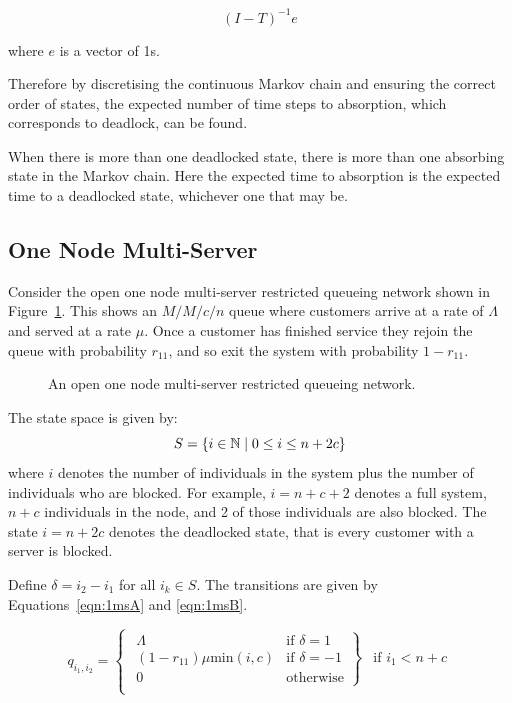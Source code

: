 \documentclass{article}
\numberwithin{equation}{section}
\begin{document}
\begin{equation} \label{eq:abs_probs}
  (I - T)^{-1}e
\end{equation}

where $e$ is a vector of 1s.

Therefore by discretising the continuous Markov chain and ensuring the correct
order of states, the expected number of time steps to absorption, which
corresponds to deadlock, can be found.

When there is more than one deadlocked state, there is more than one absorbing
state in the Markov chain.
Here the expected time to absorption is the expected time to a deadlocked
state, whichever one that may be.

\subsection{One Node Multi-Server}\label{sec:1nodeMS}


Consider the open one node multi-server restricted queueing network shown in
Figure~\ref{fig:queueingnetwork_1nodemulti}.
This shows an \(M/M/c/n\) queue where customers arrive at a rate of $\Lambda$
and served at a rate $\mu$.
Once a customer has finished service they rejoin the queue with probability
$r_{11}$, and so exit the system with probability $1 - r_{11}$.

\begin{figure}[!htbp]
  \begin{center}
  
  \end{center}
  \caption{An open one node multi-server restricted queueing network.}
  \label{fig:queueingnetwork_1nodemulti}
\end{figure}

The state space is given by:
    \[S = \{i\in\mathbb{N} \nonscript\; | \nonscript\; 0 \leq i \leq n + 2c\}\]
where \(i\) denotes the number of individuals in the system plus the number of
individuals who are blocked.
For example, $i=n+c+2$ denotes a full system, $n+c$ individuals in the node,
and 2 of those individuals are also blocked.
The state $i=n+2c$ denotes the deadlocked state, that is every customer with a
server is blocked.

Define $\delta = i_2 - i_1$ for all $i_k \in S$.
The transitions are given by Equations~\ref{eqn:1msA} and \ref{eqn:1msB}.

\begin{equation}\label{eqn:1msA}
  q_{i_1, i_2} = \left\{
  \begin{array}{rr}
    \left. \begin{array}{rr}
      \Lambda & \text{if } \delta = 1 \\
      (1-r_{11})\mu\text{min}(i, c) & \text{if } \delta = -1 \\
      0 & \text{otherwise}
    \end{array} \right\} & \text{if } i_1 < n + c \\
  \end{array} \right.
\end{equation}
\end{document}
